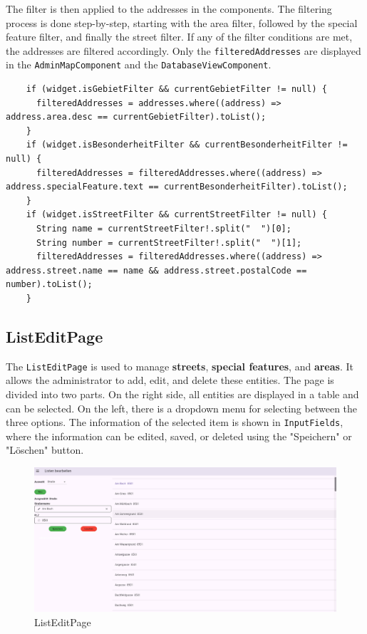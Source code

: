 The filter is then applied to the addresses in the components. The filtering process is done step-by-step, starting with the area filter, followed by the special feature filter, and finally the street filter. If any of the filter conditions are met, the addresses are filtered accordingly. Only the \texttt{filteredAddresses} are displayed in the \texttt{AdminMapComponent} and the \texttt{DatabaseViewComponent}.


\lstset{style=mycsharp, caption=Filtering addresses in AddressPage}
\begin{lstlisting}
    if (widget.isGebietFilter && currentGebietFilter != null) {
      filteredAddresses = addresses.where((address) => address.area.desc == currentGebietFilter).toList();
    }
    if (widget.isBesonderheitFilter && currentBesonderheitFilter != null) {
      filteredAddresses = filteredAddresses.where((address) => address.specialFeature.text == currentBesonderheitFilter).toList();
    }
    if (widget.isStreetFilter && currentStreetFilter != null) {
      String name = currentStreetFilter!.split("  ")[0];
      String number = currentStreetFilter!.split("  ")[1];
      filteredAddresses = filteredAddresses.where((address) => address.street.name == name && address.street.postalCode == number).toList();
    } 
\end{lstlisting}


 

\subsection{ListEditPage}
The \texttt{ListEditPage} is used to manage \textbf{streets}, \textbf{special features}, and \textbf{areas}. It allows the administrator to add, edit, and delete these entities. The page is divided into two parts. On the right side, all entities are displayed in a table and can be selected. On the left, there is a dropdown menu for selecting between the three options. The information of the selected item is shown in \texttt{InputFields}, where the information can be edited, saved, or deleted using the "Speichern" or "Löschen" button.

\begin{figure}[H]
    \centering
    \includegraphics[width=0.9\linewidth]{images/AdminPanel/ListEditPage.png}
    \caption{ListEditPage}
\end{figure}

